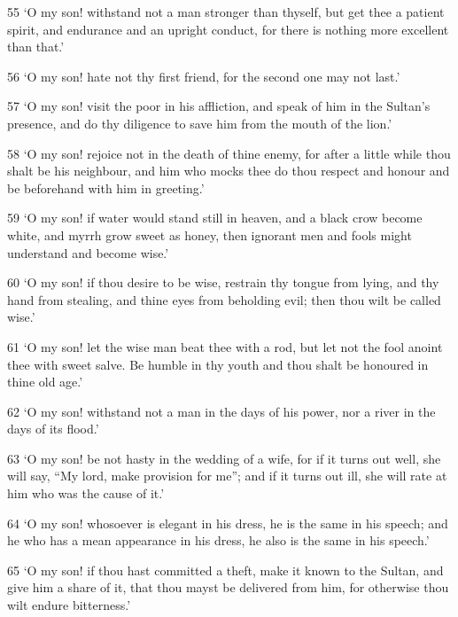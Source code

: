 \par 55 ‘O my son! withstand not a man stronger than thyself, but get thee a patient spirit, and endurance and an upright conduct, for there is nothing more excellent than that.’

\par 56 ‘O my son! hate not thy first friend, for the second one may not last.’

\par 57 ‘O my son! visit the poor in his affliction, and speak of him in the Sultan's presence, and do thy diligence to save him from the mouth of the lion.’

\par 58 ‘O my son! rejoice not in the death of thine enemy, for after a little while thou shalt be his neighbour, and him who mocks thee do thou respect and honour and be beforehand with him in greeting.’

\par 59 ‘O my son! if water would stand still in heaven, and a black crow become white, and myrrh grow sweet as honey, then ignorant men and fools might understand and become wise.’

\par 60 ‘O my son! if thou desire to be wise, restrain thy tongue from lying, and thy hand from stealing, and thine eyes from beholding evil; then thou wilt be called wise.’

\par 61 ‘O my son! let the wise man beat thee with a rod, but let not the fool anoint thee with sweet salve. Be humble in thy youth and thou shalt be honoured in thine old age.’

\par 62 ‘O my son! withstand not a man in the days of his power, nor a river in the days of its flood.’

\par 63 ‘O my son! be not hasty in the wedding of a wife, for if it turns out well, she will say, “My lord, make provision for me”; and if it turns out ill, she will rate at him who was the cause of it.’

\par 64 ‘O my son! whosoever is elegant in his dress, he is the same in his speech; and he who has a mean appearance in his dress, he also is the same in his speech.’

\par 65 ‘O my son! if thou hast committed a theft, make it known to the Sultan, and give him a share of it, that thou mayst be delivered from him, for otherwise thou wilt endure bitterness.’

